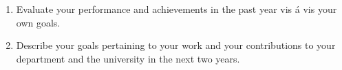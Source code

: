 \begin{enumerate}

\item Evaluate your performance and achievements in the past year vis á vis your own goals. 

\item Describe your goals pertaining to your work and your contributions to your department and the university in the next two years. 

\end{enumerate}

